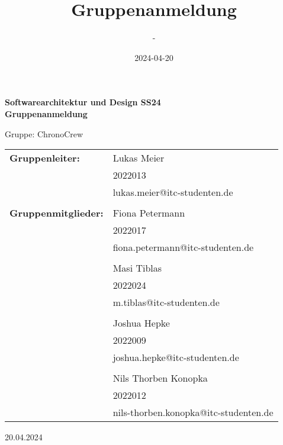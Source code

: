 \documentclass[11pt,a4paper]{article}
\title{Gruppenanmeldung}
\date{2024-04-20}
\author{-}
\begin{document}
	\begin{titlepage}
		\begin{center}			
			\Huge
			\textbf{Softwarearchitektur und Design SS24\\ Gruppenanmeldung}
			
			\vspace{0.5cm}
			\LARGE
			Gruppe: ChronoCrew
			
			\vspace{1.5cm}
			
			\vfill
			
			\large
			\begin{tabular}{p{8cm}l}
				\textbf{Gruppenleiter:} & Lukas Meier\\
				& 2022013\\
				& lukas.meier@itc-studenten.de\\ 
				&\\
				\textbf{Gruppenmitglieder:} & Fiona Petermann\\
				& 2022017\\
				& fiona.petermann@itc-studenten.de\\
				&\\
				& Masi Tiblas\\
				& 2022024\\
				& m.tiblas@itc-studenten.de\\
				&\\
				& Joshua Hepke\\
				& 2022009\\
				& joshua.hepke@itc-studenten.de\\
				&\\
				& Nils Thorben Konopka\\
				& 2022012\\
				& nils-thorben.konopka@itc-studenten.de
			\end{tabular}
			\Large
			\vfill
			20.04.2024
			
		\end{center}
	\end{titlepage}
\end{document}
